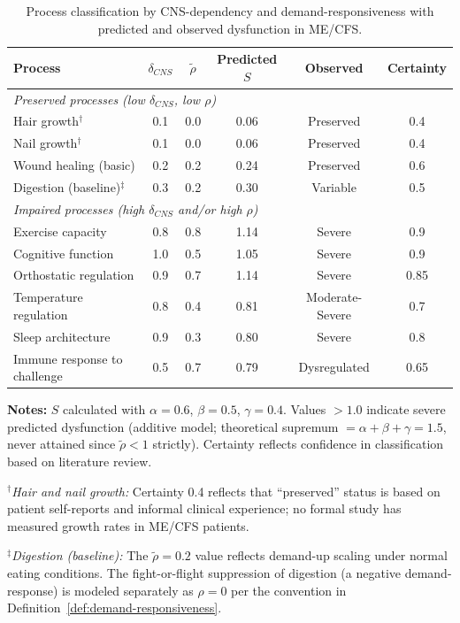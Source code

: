 \begin{table}[htbp]
\centering
\small
\caption{Process classification by CNS-dependency and demand-responsiveness with predicted and observed dysfunction in ME/CFS.}
\label{tab:process-classification}
\begin{tabular}{lccccc}
\toprule
\textbf{Process} & $\delta_{CNS}$ & $\tilde{\rho}$ & \textbf{Predicted $S$} & \textbf{Observed} & \textbf{Certainty} \\
\midrule
\multicolumn{6}{l}{\textit{Preserved processes (low $\delta_{CNS}$, low $\rho$)}} \\
Hair growth$^{\dagger}$ & 0.1 & 0.0 & 0.06 & Preserved & 0.4 \\
Nail growth$^{\dagger}$ & 0.1 & 0.0 & 0.06 & Preserved & 0.4 \\
Wound healing (basic) & 0.2 & 0.2 & 0.24 & Preserved & 0.6 \\
Digestion (baseline)$^{\ddagger}$ & 0.3 & 0.2 & 0.30 & Variable & 0.5 \\
\midrule
\multicolumn{6}{l}{\textit{Impaired processes (high $\delta_{CNS}$ and/or high $\rho$)}} \\
Exercise capacity & 0.8 & 0.8 & 1.14 & Severe & 0.9 \\
Cognitive function & 1.0 & 0.5 & 1.05 & Severe & 0.9 \\
Orthostatic regulation & 0.9 & 0.7 & 1.14 & Severe & 0.85 \\
Temperature regulation & 0.8 & 0.4 & 0.81 & Moderate-Severe & 0.7 \\
Sleep architecture & 0.9 & 0.3 & 0.80 & Severe & 0.8 \\
Immune response to challenge & 0.5 & 0.7 & 0.79 & Dysregulated & 0.65 \\
\bottomrule
\end{tabular}

\vspace{0.3cm}
\footnotesize
\textbf{Notes:} $S$ calculated with $\alpha = 0.6$, $\beta = 0.5$, $\gamma = 0.4$. Values $>1.0$ indicate severe predicted dysfunction (additive model; theoretical supremum $= \alpha + \beta + \gamma = 1.5$, never attained since $\tilde{\rho} < 1$ strictly). Certainty reflects confidence in classification based on literature review.

$^{\dagger}$\textit{Hair and nail growth:} Certainty 0.4 reflects that ``preserved'' status is based on patient self-reports and informal clinical experience; no formal study has measured growth rates in ME/CFS patients.

$^{\ddagger}$\textit{Digestion (baseline):} The $\tilde{\rho} = 0.2$ value reflects demand-up scaling under normal eating conditions. The fight-or-flight suppression of digestion (a negative demand-response) is modeled separately as $\rho = 0$ per the convention in Definition~\ref{def:demand-responsiveness}.
\end{table}


